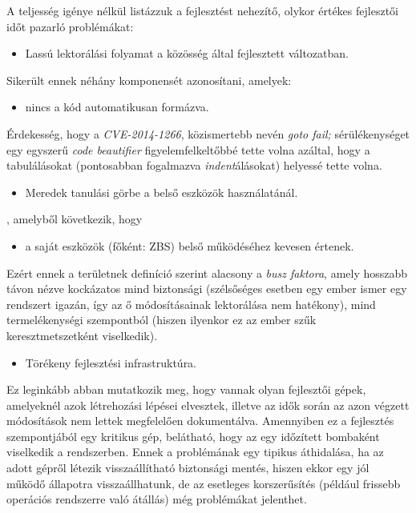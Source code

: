 A teljesség igénye nélkül listázzuk a fejlesztést nehezítő, olykor értékes fejlesztői időt pazarló
problémákat:
\begin{itemize}
    \item Lassú lektorálási folyamat a közösség által fejlesztett változatban.
\end{itemize}
Sikerült ennek néhány komponensét azonosítani, amelyek:

\begin{itemize}
    \item nincs a kód automatikusan formázva.
\end{itemize}
Érdekesség, hogy a \emph{CVE-2014-1266}\cite{cve20141266}, közismertebb nevén \emph{goto fail;} sérülékenységet egy
egyszerű \emph{code beautifier} figyelemfelkeltőbbé tette volna azáltal, hogy a tabulálásokat
(pontosabban fogalmazva \emph{indent}álásokat) helyessé tette volna.

\begin{itemize}
    \item Meredek tanulási görbe a belső eszközök használatánál.
\end{itemize}
, amelyből következik, hogy
\begin{itemize}
    \item a saját eszközök (főként: ZBS) belső működéséhez kevesen értenek.
\end{itemize}
Ezért ennek a területnek definíció szerint alacsony a \emph{busz faktora}, amely hosszabb távon
nézve kockázatos mind biztonsági (szélsőséges esetben egy ember ismer egy rendszert igazán, így az
ő módosításainak lektorálása nem hatékony), mind termelékenységi szempontból (hiszen ilyenkor
ez az ember szűk keresztmetszetként viselkedik).

\begin{itemize}
    \item Törékeny fejlesztési infrastruktúra.
\end{itemize}
Ez leginkább abban mutatkozik meg, hogy vannak olyan fejlesztői gépek, amelyeknél azok létrehozási
lépései elvesztek, illetve az idők során az azon végzett módosítások nem lettek megfelelően
dokumentálva. Amennyiben ez a fejlesztés szempontjából egy kritikus gép, belátható, hogy az egy
időzített bombaként viselkedik a rendszerben. Ennek a problémának egy tipikus áthidalása, ha az
adott gépről létezik visszaállítható biztonsági mentés, hiszen ekkor egy jól működő állapotra
visszaállhatunk, de az esetleges korszerűsítés (például frissebb operációs rendszerre való átállás)
még problémákat jelenthet.

